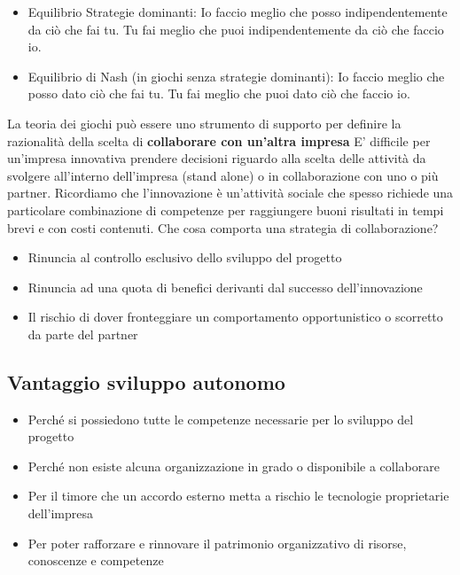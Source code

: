 \documentclass{article}
\begin{document}
\begin{itemize}
\item Equilibrio Strategie dominanti:
Io faccio meglio che posso indipendentemente da ciò che fai tu.
Tu fai meglio che puoi indipendentemente da ciò che faccio io.
\item Equilibrio di Nash (in giochi senza strategie dominanti):
Io faccio meglio che posso dato ciò che fai tu.
Tu fai meglio che puoi dato ciò che faccio io.

\end{itemize}

La teoria dei giochi può essere uno strumento di supporto per definire la
razionalità della scelta di \textbf{collaborare con un’altra impresa}
E’ difficile per un’impresa innovativa prendere decisioni riguardo alla scelta
delle attività da svolgere all’interno dell’impresa (stand alone) o in
collaborazione con uno o più partner.
Ricordiamo che l’innovazione è un’attività sociale che spesso richiede una
particolare combinazione di competenze per raggiungere buoni risultati in
tempi brevi e con costi contenuti.
Che cosa comporta una strategia di collaborazione?
\begin{itemize}
	\item Rinuncia al controllo esclusivo dello sviluppo del progetto
	\item Rinuncia ad una quota di benefici derivanti dal successo
	dell’innovazione
	\item Il rischio di dover fronteggiare un comportamento opportunistico o
	scorretto da parte del partner	
\end{itemize}

\subsection{Vantaggio sviluppo autonomo }
\begin{itemize}
\item	Perché si possiedono tutte le competenze necessarie per lo sviluppo
	del progetto
\item	Perché non esiste alcuna organizzazione in grado o disponibile a
	collaborare
\item	Per il timore che un accordo esterno metta a rischio le tecnologie
	proprietarie dell’impresa
\item	Per poter rafforzare e rinnovare il patrimonio organizzativo di risorse,
	conoscenze e competenze
\end{itemize}
\end{document}
